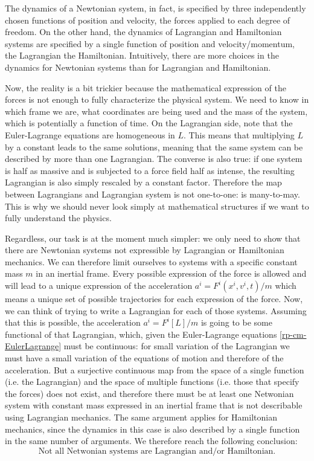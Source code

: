 The dynamics of a Newtonian system, in fact, is specified by three independently chosen functions of position and velocity, the forces applied to each degree of freedom. On the other hand, the dynamics of Lagrangian and Hamiltonian systems are specified by a single function of position and velocity/momentum, the Lagrangian the Hamiltonian. Intuitively, there are more choices in the dynamics for Newtonian systems than for Lagrangian and Hamiltonian.

Now, the reality is a bit trickier because the mathematical expression of the forces is not enough to fully characterize the physical system. We need to know in which frame we are, what coordinates are being used and the mass of the system, which is potentially a function of time. On the Lagrangian side, note that the Euler-Lagrange equations are homogeneous in $L$. This means that multiplying $L$ by a constant leads to the same solutions, meaning that the same system can be described by more than one Lagrangian. The converse is also true: if one system is half as massive and is subjected to a force field half as intense, the resulting Lagrangian is also simply rescaled by a constant factor. Therefore the map between Lagrangians and Lagrangian system is not one-to-one: is many-to-may. This is why we should never look simply at mathematical structures if we want to fully understand the physics.

Regardless, our task is at the moment much simpler: we only need to show that there are Newtonian systems not expressible by Lagrangian or Hamiltonian mechanics. We can therefore limit ourselves to systems with a specific constant mass $m$ in an inertial frame. Every possible expression of the force is allowed and will lead to a unique expression of the acceleration $a^i=F^i(x^i, v^i, t)/m$ which means a unique set of possible trajectories for each expression of the force. Now, we can think of trying to write a Lagrangian for each of those systems. Assuming that this is possible, the acceleration $a^i=F^i[L]/m$ is going to be some functional of that Lagrangian, which, given the Euler-Lagrange equations \ref{rp-cm-EulerLagrange} must be continuous: for small variation of the Lagrangian we must have a small variation of the equations of motion and therefore of the acceleration. But a surjective continuous map from the space of a single function (i.e. the Lagrangian) and the space of multiple functions (i.e. those that specify the forces) does not exist, and therefore there must be at least one Netwonian system with constant mass expressed in an inertial frame that is not describable using Lagrangian mechanics. The same argument applies for Hamiltonian mechanics, since the dynamics in this case is also described by a single function in the same number of arguments. We therefore reach the following conclusion:
\begin{equation}
	\textrm{Not all Netwonian systems are Lagrangian and/or Hamiltonian.}
\end{equation}

